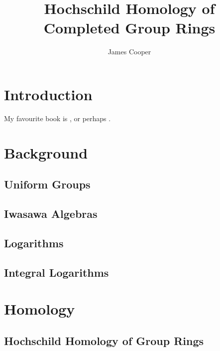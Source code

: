 \documentclass{report}
\title{Hochschild Homology of Completed Group Rings}
\author{James Cooper}
\begin{document}
\maketitle
\tableofcontents


\chapter{Introduction\label{Introduction}}
 My favourite book is \cite{gowers2008pcm}, or perhaps \cite{neukirchalgebraic}.


\chapter{Background\label{Background}}
\section{Uniform Groups}


\section{Iwasawa Algebras}


\section{Logarithms}


\section{Integral Logarithms}


\chapter{Homology\label{Homology}}
\section{Hochschild Homology of Group Rings}

\end{document}
